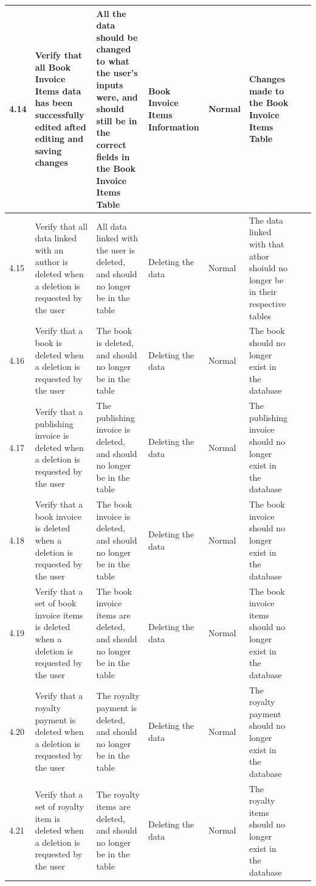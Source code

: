 \begin{landscape}
\begin{center}
\begin{longtable}{|p{1.5cm}|p{2cm}|p{2.5cm}|p{2.5cm}|p{2cm}|p{2cm}|p{2cm}|p{2cm}|}
\rowcolor{lightgray} 4.14 & Verify that all Book Invoice Items data has been successfully edited afted editing and saving changes & All the data should be changed to what the user's inputs were, and should still be in the correct fields in the Book Invoice Items Table &  Book Invoice Items Information & Normal & Changes made to the Book Invoice Items Table & & \\ \hline
\rowcolor{lightgray} 4.15 & Verify that all data linked with an author is deleted when a deletion is requested by the user & All data linked with the user is deleted, and should no longer be in the table & Deleting the data & Normal & The data linked with that athor shoiuld no longer be in their respective tables & & \\ \hline
\rowcolor{lightgray} 4.16 & Verify that a book is deleted when a deletion is requested by the user & The book is deleted, and should no longer be in the table & Deleting the data & Normal & The book should no longer exist in the database & & \\ \hline
\rowcolor{lightgray} 4.17 & Verify that a publishing invoice is deleted when a deletion is requested by the user & The publishing invoice is deleted, and should no longer be in the table & Deleting the data & Normal & The publishing invoice should no longer exist in the database & & \\ \hline
\rowcolor{lightgray} 4.18 & Verify that a book invoice is deleted when a deletion is requested by the user & The book invoice is deleted, and should no longer be in the table & Deleting the data & Normal & The book invoice should no longer exist in the database & & \\ \hline
\rowcolor{lightgray} 4.19 & Verify that a set of book invoice items is deleted when a deletion is requested by the user & The book invoice items are deleted, and should no longer be in the table & Deleting the data & Normal & The book invoice items should no longer exist in the database & & \\ \hline
\rowcolor{lightgray} 4.20 & Verify that a royalty payment is deleted when a deletion is requested by the user & The royalty payment is deleted, and should no longer be in the table & Deleting the data & Normal & The royalty payment should no longer exist in the database & & \\ \hline
\rowcolor{lightgray} 4.21 & Verify that a set of royalty item is deleted when a deletion is requested by the user & The royalty items are deleted, and should no longer be in the table & Deleting the data & Normal & The royalty items should no longer exist in the database & & \\ \hline

\end{longtable}
\end{center}
\end{landscape}

